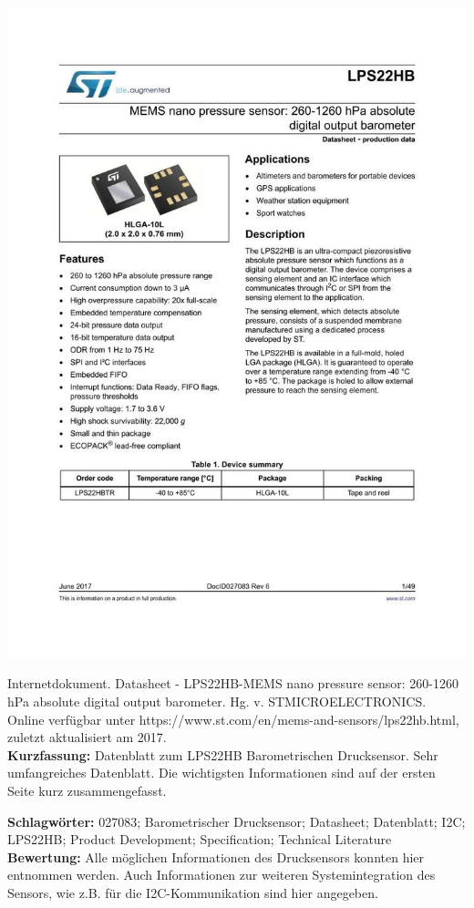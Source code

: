 {
\begin{minipage}{0.38\textwidth}
	\includegraphics[width=\linewidth]{images/STM2.jpg}
\end{minipage}
\hfill
\begin{minipage}{0.6\textwidth}
Internetdokument. Datasheet - LPS22HB-MEMS nano pressure sensor: 260-1260 hPa absolute digital output barometer.
Hg. v. STMICROELECTRONICS. Online verfügbar unter https://www.st.com/en/mems-and-sensors/lps22hb.html, zuletzt aktualisiert am 2017.
\\ \textbf{Kurzfassung:}
Datenblatt zum LPS22HB Barometrischen Drucksensor. Sehr umfangreiches Datenblatt. Die wichtigsten Informationen sind auf der ersten Seite kurz zusammengefasst.
\end{minipage}
\textbf{Schlagwörter:}
027083; Barometrischer Drucksensor; Datasheet; Datenblatt; I2C; LPS22HB; Product Development; Specification; Technical Literature
\\ \textbf{Bewertung:}
Alle möglichen Informationen des Drucksensors konnten hier entnommen werden. Auch Informationen zur weiteren Systemintegration des Sensors, wie z.B. für die I2C-Kommunikation sind hier angegeben.
}

